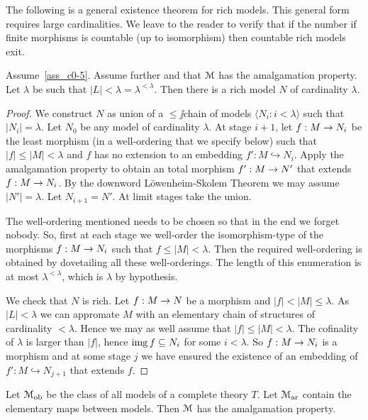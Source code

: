\documentclass[creche.tex]{subfiles}
\begin{document}
The following is a general existence theorem for rich models. This general form requires large cardinalities. We leave to the reader to verify that if the number if finite morphisms is countable (up to isomorphism) then countable rich models exit.


\begin{theorem}  Assume~\ref{ass_c0-5}. Assume further  and that $\EuScript M$ has the amalgamation property. Let $\lambda$ be such that $|L|<\lambda=\lambda^{<\lambda}$.  Then there is a rich model $N$ of cardinality $\lambda$.
\end{theorem}

\begin{proof} We construct $N$ as union of a $\le\jj$chain of models $\langle N_i:i < \lambda\rangle$ such that $|N_i| = \lambda$. Let $N_0$ be any model of cardinality $\lambda$. At stage $i+1$, let $f:M\rightarrow N_i$ be the least morphism (in a well-ordering that we specify below) such that $|f|\le|M|<\lambda$ and $f$ has no extension to an embedding $f':M\hookrightarrow N_i$. Apply the amalgamation property to obtain an total morphism $f':M\rightarrow N'$ that extends $f:M\rightarrow N_i$. By the downword L\"owenheim-Skolem Theorem we may assume $|N'|=\lambda$. Let $N_{i+1}=N'$. At limit stages take the union.

The well-ordering mentioned needs to be chosen so that in the end we forget nobody. So, first at each stage we well-order the isomorphism-type of the morphisms $f:M\rightarrow N_i$ such that  $f\le|M|<\lambda$. Then the required well-ordering is obtained by dovetailing all these well-orderings.  The length of this enumeration is at most $\lambda^{<\lambda}$, which is $\lambda$ by hypothesis.

We check that $N$ is rich. Let $f:M\rightarrow N$ be a morphism and $|f|<|M|\le\lambda$. As $|L|<\lambda$ we can appromate $M$ with an elementary chain of structures of cardinality $<\lambda$. Hence we may as well assume that $|f|\le|M|<\lambda$. The cofinality of $\lambda$ is larger than $|f|$, hence $\mathop{\rm img} f\subseteq N_i$ for some $i<\lambda$. So $f:M\rightarrow N_i$ is a morphism and at some stage $j$ we have ensured the existence of an embedding of $f':M\hookrightarrow N_{j+1}$ that extends $f$.
\end{proof}

\begin{proposition}
Let $\EuScript M_{\rm ob}$ be the class of all models of a complete theory $T$. Let $\EuScript M_{\rm ar}$ contain the elementary maps between models. Then $\EuScript M$ has the amalgamation property.
\end{proposition}
\end{document}

